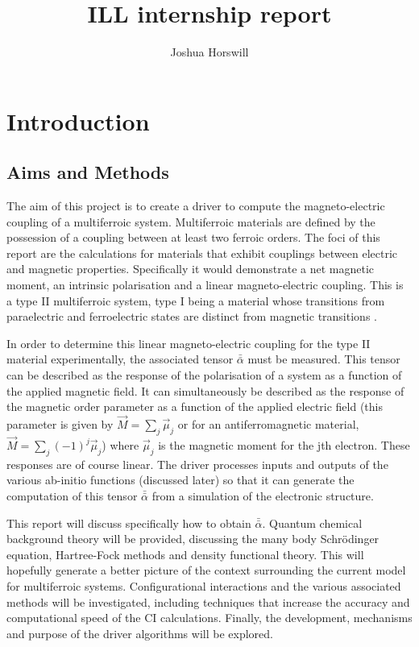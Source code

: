 \documentclass[10pt]{article}
\author{Joshua Horswill}
\title{ILL internship report}
\begin{document}
\maketitle
\tableofcontents
\newpage
\section{Introduction}
\subsection{Aims and Methods}
The aim of this project is to create a driver to compute the magneto-electric coupling of a multiferroic system. Multiferroic materials are defined by the possession of a coupling between at least two ferroic orders. The foci of this report are the calculations for materials that exhibit couplings between electric and magnetic properties. Specifically it would demonstrate a net magnetic moment, an intrinsic polarisation and a linear magneto-electric coupling. This is a type II multiferroic system, type I being a material whose transitions from paraelectric and ferroelectric states are distinct from magnetic transitions \cite{Hur2004}\cite{goto2004ferroelectricity}.

In order to determine this linear magneto-electric coupling for the type II material experimentally, the associated tensor $\bar{\bar{\alpha}}$ must be measured. This tensor can be described as the response of the polarisation of a system as a function of the applied magnetic field. It can simultaneously be described as the response of the magnetic order parameter as a function of the applied electric field (this parameter is given by $\vec{M} = \sum_j \vec{\mu}_j$ or for an antiferromagnetic material, $\vec{M} = \sum_j (-1)^j \vec{\mu}_j$) where $\vec{\mu}_j$ is the magnetic moment for the jth electron. These responses are of course linear. The driver processes inputs and outputs of the various ab-initio functions (discussed later) so that it can generate the computation of this tensor $\bar{\bar{\alpha}}$ from a simulation of the electronic structure.

This report will discuss specifically how to obtain $\bar{\bar{\alpha}}$. Quantum chemical background theory will be provided, discussing the many body Schrödinger equation, Hartree-Fock methods and density functional theory. This will hopefully generate a better picture of the context surrounding the current model for multiferroic systems. Configurational interactions and the various associated methods will be investigated, including techniques that increase the accuracy and computational speed of the CI calculations. Finally, the development, mechanisms and purpose of the driver algorithms will be explored.
\end{document}
